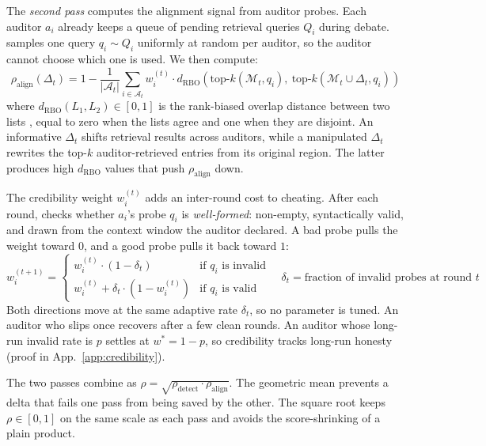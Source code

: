The \emph{second pass} computes the alignment signal from auditor
probes. Each auditor $a_i$ already keeps a queue of pending
retrieval queries $Q_i$ during debate. \system samples one query
$q_i \sim Q_i$ uniformly at random per auditor, so the auditor cannot
choose which one is used. We then compute:
\begin{equation}
    \rho_{\text{align}}(\Delta_t) = 1 -
    \frac{1}{|\mathcal{A}_t|} \sum_{i \in \mathcal{A}_t}
    w_i^{(t)} \cdot
    d_{\text{RBO}}\!\left(
        \text{top-}k(\mathcal{M}_t, q_i),\
        \text{top-}k(\mathcal{M}_t \cup \Delta_t, q_i)
    \right)
\label{eq:rho_ret}
\end{equation}
where $d_{\text{RBO}}(L_1, L_2) \in [0,1]$ is the rank-biased overlap
distance between two lists \citep{corsi2024treatment}, equal
to zero when the lists agree and one when they are disjoint. An
informative $\Delta_t$ shifts retrieval results across
auditors, while a manipulated $\Delta_t$ rewrites the top-$k$ auditor-retrieved entries
from its original region. The latter produces high
$d_{\text{RBO}}$ values that push $\rho_{\text{align}}$ down.

The credibility weight $w_i^{(t)}$ adds an inter-round cost to
cheating. After each round, \system checks whether $a_i$'s probe
$q_i$ is \emph{well-formed}: non-empty, syntactically valid, and
drawn from the context window the auditor declared. A bad probe pulls the weight toward $0$, and a good probe
pulls it back toward $1$:
\begin{equation}
    w_i^{(t+1)} =
    \begin{cases}
        w_i^{(t)} \cdot (1 - \delta_t)
        & \text{if } q_i \text{ is invalid} \\[2pt]
        w_i^{(t)} + \delta_t \cdot (1 - w_i^{(t)})
        & \text{if } q_i \text{ is valid}
    \end{cases}
    \quad
    \delta_t = \text{fraction of invalid probes at round } t
\label{eq:cred_weight}
\end{equation}
Both directions move at the same adaptive rate $\delta_t$, so no
parameter is tuned. An auditor who slips once recovers after a few
clean rounds. An auditor whose long-run invalid rate is $p$ settles
at $w^* = 1 - p$, so credibility tracks long-run honesty (proof in
App.~\ref{app:credibility}).

The two passes combine as $\rho = \sqrt{\rho_{\text{detect}} \cdot
\rho_{\text{align}}}$. The geometric mean prevents a delta that fails
one pass from being saved by the other. The square root keeps $\rho
\in [0,1]$ on the same scale as each pass and avoids the
score-shrinking of a plain product.

